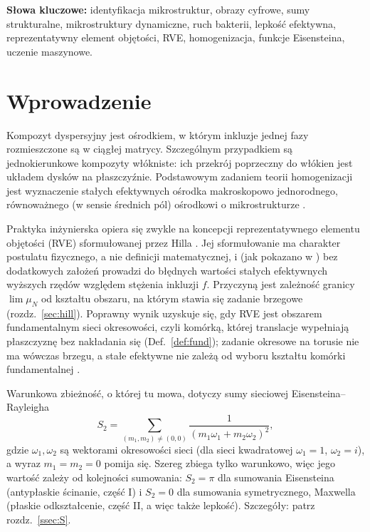 \documentclass[12pt,a4paper,twoside,openright]{report}
\theoremstyle{definition}
\theoremstyle{remark}
\begin{document}
\noindent\textbf{Słowa kluczowe:} identyfikacja mikrostruktur, obrazy cyfrowe, sumy strukturalne, mikrostruktury dynamiczne, ruch bakterii, lepkość efektywna, reprezentatywny element objętości, RVE, homogenizacja, funkcje Eisensteina, uczenie maszynowe.

\newpage

\tableofcontents
\newpage

{}
\lstlistoflistings
\newpage


\chapter{Wprowadzenie}

Kompozyt dyspersyjny jest ośrodkiem, w którym inkluzje jednej fazy rozmieszczone są w ciągłej matrycy. Szczególnym przypadkiem są jednokierunkowe kompozyty włókniste: ich przekrój poprzeczny do włókien jest układem dysków na płaszczyźnie. Podstawowym zadaniem teorii homogenizacji jest wyznaczenie stałych efektywnych ośrodka makroskopowo jednorodnego, równoważnego (w sensie średnich pól) ośrodkowi o mikrostrukturze \cite{czapla2025computational}.

Praktyka inżynierska opiera się zwykle na koncepcji reprezentatywnego elementu objętości (RVE) sformułowanej przez Hilla \cite{hill1963elastic,hill1965self}. Jej sformułowanie ma charakter postulatu fizycznego, a nie definicji matematycznej, i (jak pokazano w \cite{czapla2025computational}) bez dodatkowych założeń prowadzi do błędnych wartości stałych efektywnych wyższych rzędów względem stężenia inkluzji $f$. Przyczyną jest zależność granicy $\lim\mu_N$ od kształtu obszaru, na którym stawia się zadanie brzegowe (rozdz.~\ref{sec:hill}). Poprawny wynik uzyskuje się, gdy RVE jest obszarem fundamentalnym sieci okresowości, czyli komórką, której translacje wypełniają płaszczyznę bez nakładania się (Def.~\ref{def:fund}); zadanie okresowe na torusie nie ma wówczas brzegu, a stałe efektywne nie zależą od wyboru kształtu komórki fundamentalnej \cite{czapla2025computational}.

Warunkowa zbieżność, o której tu mowa, dotyczy sumy sieciowej Eisensteina--Rayleigha
\begin{equation*}
{S_2=\sum_{(m_1,m_2)\ne(0,0)}\frac{1}{(m_1\omega_1+m_2\omega_2)^2},}
\end{equation*}
gdzie $\omega_1,\omega_2$ są wektorami okresowości sieci (dla sieci kwadratowej $\omega_1=1$, $\omega_2=i$), a wyraz $m_1=m_2=0$ pomija się. Szereg zbiega tylko warunkowo, więc jego wartość zależy od kolejności sumowania: $S_2=\pi$ dla sumowania Eisensteina (antypłaskie ścinanie, część I) i $S_2=0$ dla sumowania symetrycznego, Maxwella (płaskie odkształcenie, część II, a więc także lepkość). Szczegóły: patrz rozdz.~\ref{ssec:S}.
 
\end{document}
